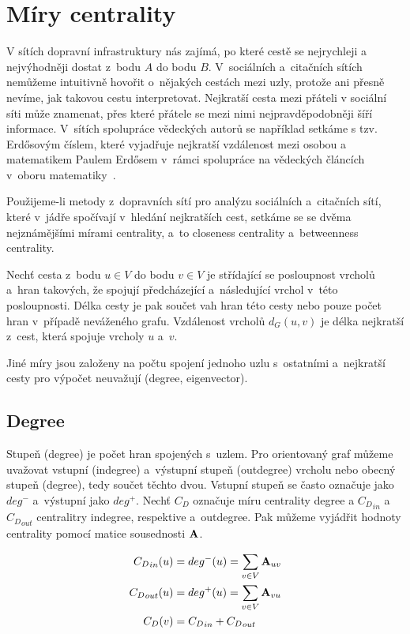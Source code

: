 \documentclass{bakalarka}
\begin{document}
\section{Míry centrality}
V sítích dopravní infrastruktury nás zajímá, po které cestě se nejrychleji a
nejvýhodněji dostat z~bodu $A$ do bodu $B$. V~sociálních a~citačních sítích
nemůžeme intuitivně hovořit o~nějakých cestách mezi uzly, protože ani přesně
nevíme, jak takovou cestu interpretovat. Nejkratší cesta mezi přáteli v
sociální síti může znamenat, přes které přátele se mezi nimi nejpravděpodobněji
šíří informace. V~sítích spolupráce vědeckých autorů se například setkáme s
tzv. Erdősovým číslem, které vyjadřuje nejkratší vzdálenost mezi osobou a
matematikem Paulem Erdősem v~rámci spolupráce na vědeckých článcích v~oboru
matematiky~\citep{barabasi2005}.

Použijeme-li metody z~dopravních sítí pro analýzu sociálních a~citačních sítí,
které v~jádře spočívají v~hledání nejkratších cest, setkáme se se dvěma
nejznámějšími mírami centrality, a~to closeness centrality a~betweenness
centrality.

Nechť cesta z~bodu $u \in V$ do bodu $v \in V$ je střídající se posloupnost
vrcholů a~hran takových, že spojují předcházející a~následující vrchol v~této
posloupnosti. Délka cesty je pak součet vah hran této cesty nebo pouze počet
hran v~případě neváženého grafu. Vzdálenost vrcholů $d_G(u, v)$ je délka
nejkratší z~cest, která spojuje vrcholy $u$ a~$v$.

Jiné míry jsou založeny na počtu spojení jednoho uzlu s~ostatními a~nejkratší
cesty pro výpočet neuvažují (degree, eigenvector).


\subsection{Degree}
Stupeň (degree) je počet hran spojených s~uzlem. Pro orientovaný graf můžeme
uvažovat vstupní (indegree) a~výstupní stupeň (outdegree) vrcholu nebo obecný
stupeň (degree), tedy součet těchto dvou. Vstupní stupeň se často označuje jako
$deg^-$ a~výstupní jako $deg^+$. Nechť $C_D$ označuje míru centrality degree a
${C_D}_{in}$ a ${C_D}_{out}$ centralitry indegree, respektive a~outdegree. Pak
můžeme vyjádřit hodnoty centrality pomocí matice sousednosti ${\bf A}$.

\begin{align*}
{C_D}_{in}(u) &= deg^-(u)  = \displaystyle\sum\limits_{v \in V} {\bf A}_{uv} \\
{C_D}_{out}(u) &= deg^+(u) = \displaystyle\sum\limits_{v \in V} {\bf A}_{vu} \\
{C_D}(v) &= {C_D}_{in} + {C_D}_{out}
\end{align*}
\end{document}
